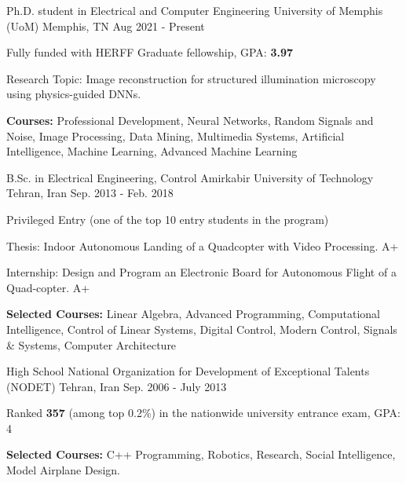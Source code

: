 

\begin{cventries}

  \cventry
    {Ph.D. student in Electrical and Computer Engineering} %
    {University of Memphis (UoM)} %
    {Memphis, TN} %
    {Aug 2021 - Present} %
    {
      \begin{cvitems} %
        \item {Fully funded with HERFF Graduate fellowship, GPA:\textbf{ 3.97}}
        \item {Research Topic: Image reconstruction for structured illumination microscopy using physics-guided DNNs.}
        \item {\textbf{Courses:} Professional Development, Neural Networks, Random Signals and Noise, Image Processing, Data Mining, Multimedia Systems, Artificial Intelligence, Machine Learning, Advanced Machine Learning}
      \end{cvitems}
    }
    
  \cventry
    {B.Sc. in Electrical Engineering, Control} %
    {Amirkabir University of Technology} %
    {Tehran, Iran} %
    {Sep. 2013 - Feb. 2018} %
    {
      \begin{cvitems} %
        \item {Privileged Entry (one of the top 10 entry students in the program)}
        \item {Thesis: Indoor Autonomous Landing of a Quadcopter with Video Processing. A+} 
        \item {Internship: Design and Program an Electronic Board for Autonomous Flight of a Quad-copter. A+}
        \item {\textbf{Selected Courses:} Linear Algebra, Advanced Programming, Computational Intelligence, Control of Linear Systems, Digital Control, Modern Control, Signals \& Systems, Computer Architecture}
      \end{cvitems}
    }
    
  \cventry
    {High School} %
    {National Organization for Development of Exceptional Talents (NODET)} %
    {Tehran, Iran} %
    {Sep. 2006 - July 2013} %
    {
      \begin{cvitems} %
        \item {Ranked \textbf{357} (among top 0.2\%) in the nationwide university entrance exam, GPA: 4}
        \item {\textbf{Selected Courses:} C++ Programming, Robotics, Research, Social Intelligence, Model Airplane Design.}
      \end{cvitems}
    }
\end{cventries}
